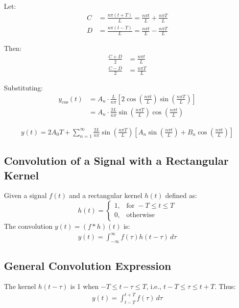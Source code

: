 Let:
\begin{align*}
C &= \frac{n\pi (t + T)}{L} = \frac{n\pi t}{L} + \frac{n\pi T}{L} \\
D &= \frac{n\pi (t - T)}{L} = \frac{n\pi t}{L} - \frac{n\pi T}{L}
\end{align*}

Then:
\begin{align*}
\frac{C + D}{2} &= \frac{n\pi t}{L} \\
\frac{C - D}{2} &= \frac{n\pi T}{L}
\end{align*}

Substituting:
\begin{align*}
y_{\text{cos}}(t) &= A_n \cdot \frac{L}{n\pi} \left[ 2 \cos\left(\frac{n\pi t}{L}\right) \sin\left(\frac{n\pi T}{L}\right) \right] \\
&= A_n \cdot \frac{2L}{n\pi} \sin\left(\frac{n\pi T}{L}\right) \cos\left(\frac{n\pi t}{L}\right)
\end{align*}

\begin{align*}
y(t) = 2A_0 T + \sum_{n=1}^\infty \frac{2L}{n\pi} \sin\left(\frac{n\pi T}{L}\right) \left[ A_n \sin\left(\frac{n\pi t}{L}\right) + B_n \cos\left(\frac{n\pi t}{L}\right) \right]
\end{align*}

\subsection{Convolution of a Signal with a Rectangular Kernel}

Given a signal $f(t)$ and a rectangular kernel $h(t)$ defined as:
\[
h(t)=
\begin{cases}
    1, & \text{for } -T \leq t \leq T \\
    0, & \text{otherwise}
\end{cases}
\]
The convolution $y(t) = (f * h)(t)$ is:
\begin{align*}
y(t) = \int_{-\infty}^{\infty} f(\tau) h(t - \tau) \,d\tau
\end{align*}

\subsection{General Convolution Expression}
The kernel $h(t - \tau)$ is 1 when $-T \leq t - \tau \leq T$, i.e., $t - T \leq \tau \leq t + T$. Thus:
\begin{align*}
y(t) = \int_{t - T}^{t + T} f(\tau) \,d\tau
\end{align*}

